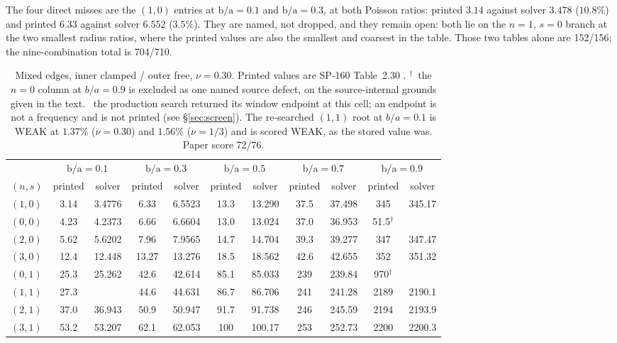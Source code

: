 \documentclass[11pt]{article}
\newcommand{\ba}{\mbox{b/a}}
\newcommand{\winend}{\mbox{\textsection}}
\begin{document}
The four direct misses are the $(1,0)$ entries at $\ba=0.1$ and $\ba=0.3$, at
both Poisson ratios: printed $3.14$ against solver $3.478$ ($10.8\%$) and
printed $6.33$ against solver $6.552$ ($3.5\%$). They are named, not dropped, and
they remain open: both lie on the $n=1$, $s=0$ branch at the two smallest
radius ratios, where the printed values are also the smallest and coarsest in
the table.
Those two tables alone are 152/156; the nine-combination total is 704/710.

\begin{table}[htbp]\centering\footnotesize
\caption{Mixed edges, inner clamped / outer free, $\nu=0.30$. Printed values
are SP-160 Table~2.30 \cite{leissaSP160,vogelSkinner}. $^{\dagger}$~the $n=0$
column at $b/a=0.9$ is excluded as one named source defect, on the
source-internal grounds given in the text. \winend~the production search
returned its window endpoint at this cell; an endpoint is not a frequency
and is not printed (see \S\ref{sec:screen}). The re-searched $(1,1)$ root at
$b/a=0.1$ is WEAK at $1.37\%$ ($\nu=0.30$) and $1.56\%$ ($\nu=1/3$) and is
scored WEAK, as the stored value was. Paper score 72/76.}
\label{tab:t230-nu30}
\begin{tabular}{lcccccccccc}
\toprule
& \multicolumn{2}{c}{$\ba=0.1$} & \multicolumn{2}{c}{$\ba=0.3$}
& \multicolumn{2}{c}{$\ba=0.5$} & \multicolumn{2}{c}{$\ba=0.7$}
& \multicolumn{2}{c}{$\ba=0.9$}\\
\cmidrule(lr){2-3}\cmidrule(lr){4-5}\cmidrule(lr){6-7}\cmidrule(lr){8-9}\cmidrule(lr){10-11}
$(n,s)$ & printed & solver & printed & solver & printed & solver
& printed & solver & printed & solver\\
\midrule
$(1,0)$ & 3.14 & 3.4776 & 6.33 & 6.5523 & 13.3 & 13.290 & 37.5 & 37.498 & 345 & 345.17 \\
$(0,0)$ & 4.23 & 4.2373 & 6.66 & 6.6604 & 13.0 & 13.024 & 37.0 & 36.953 & 51.5$^{\dagger}$ & \winend \\
$(2,0)$ & 5.62 & 5.6202 & 7.96 & 7.9565 & 14.7 & 14.704 & 39.3 & 39.277 & 347 & 347.47 \\
$(3,0)$ & 12.4 & 12.448 & 13.27 & 13.276 & 18.5 & 18.562 & 42.6 & 42.655 & 352 & 351.32 \\
$(0,1)$ & 25.3 & 25.262 & 42.6 & 42.614 & 85.1 & 85.033 & 239 & 239.84 & 970$^{\dagger}$ & \winend \\
$(1,1)$ & 27.3 & \winend & 44.6 & 44.631 & 86.7 & 86.706 & 241 & 241.28 & 2189 & 2190.1 \\
$(2,1)$ & 37.0 & 36.943 & 50.9 & 50.947 & 91.7 & 91.738 & 246 & 245.59 & 2194 & 2193.9 \\
$(3,1)$ & 53.2 & 53.207 & 62.1 & 62.053 & 100 & 100.17 & 253 & 252.73 & 2200 & 2200.3 \\
\bottomrule
\end{tabular}
\end{table}
\end{document}
